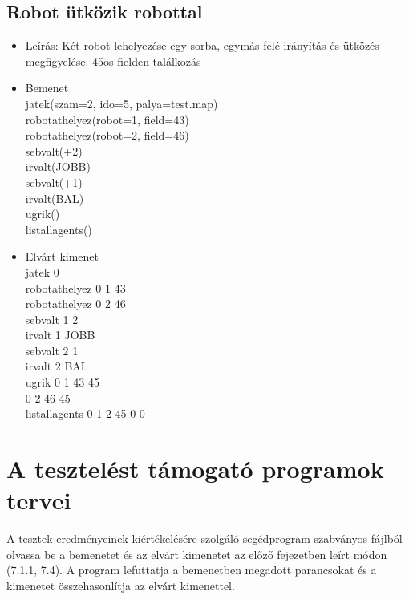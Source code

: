 \subsection{Robot ütközik robottal}
\begin{itemize}
	\item Leírás: Két robot lehelyezése egy sorba, egymás felé irányítás és ütközés megfigyelése. 45ös fielden találkozás
	\item Bemenet\\
		jatek(szam=2, ido=5, palya=test.map) \\
		robotathelyez(robot=1, field=43) \\
		robotathelyez(robot=2, field=46) \\	
		sebvalt(+2) \\
		irvalt(JOBB) \\
		sebvalt(+1) \\
		irvalt(BAL) \\
		ugrik() \\
		listallagents() \\
	\item Elvárt kimenet\\
		jatek 0 \\ 
		robotathelyez 0 1 43 \\		
		robotathelyez 0 2 46 \\		
		sebvalt 1 2 \\
		irvalt 1 JOBB \\
		sebvalt 2 1 \\
		irvalt 2 BAL \\		
		ugrik 0 1 43 45 \\ 
	  		  0 2 46 45 \\ 
		listallagents 0 1 2 45 0 0 \\
\end{itemize}

\section{A tesztelést támogató programok tervei}

A tesztek eredményeinek kiértékelésére szolgáló segédprogram szabványos fájlból olvassa be a bemenetet és az elvárt kimenetet az előző fejezetben leírt módon (7.1.1, 7.4). A program lefuttatja a bemenetben megadott parancsokat és a kimenetet összehasonlítja az elvárt kimenettel.